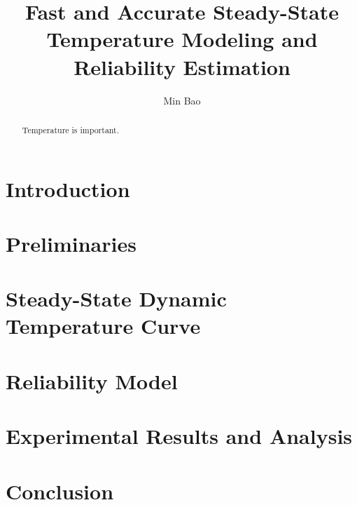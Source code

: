 \documentclass[conference]{IEEEtran}
\title{Fast and Accurate Steady-State Temperature Modeling and Reliability Estimation}
\author{Min Bao}
\newcommand{\ssdtc}{Steady-State Dynamic Temperature Curve}
\begin{document}
  \maketitle

  \begin{abstract}
    Temperature is important.
  \end{abstract}

  \section{Introduction}
  

  \section{Preliminaries}
  

  \section{\ssdtc}
  

  \section{Reliability Model}
  

  \section{Experimental Results and Analysis} \label{sec:results}
  

  \section{Conclusion}
  

  
\end{document}
